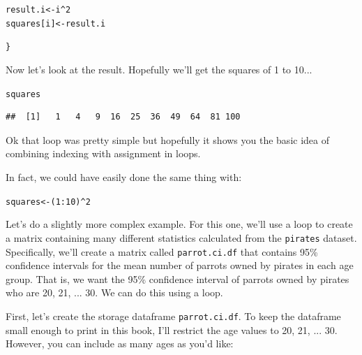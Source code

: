 \documentclass{tufte-book}\usepackage[]{graphicx}\usepackage[]{color}
\makeatletter
\newcommand{\hlnum}[1]{\textcolor[rgb]{0.686,0.059,0.569}{#1}}%
\newcommand{\hlopt}[1]{\textcolor[rgb]{0,0,0}{#1}}%
\newcommand{\hlstd}[1]{\textcolor[rgb]{0.345,0.345,0.345}{#1}}%
\newcommand{\hlkwb}[1]{\textcolor[rgb]{0.69,0.353,0.396}{#1}}%
\newenvironment{kframe}{%
 \def\at@end@of@kframe{}%
 \ifinner\ifhmode%
  \def\at@end@of@kframe{\end{minipage}}%
  \begin{minipage}{\columnwidth}%
 \fi\fi%
 \def\FrameCommand##1{\hskip\@totalleftmargin \hskip-\fboxsep
 \colorbox{shadecolor}{##1}\hskip-\fboxsep
     \hskip-\linewidth \hskip-\@totalleftmargin \hskip\columnwidth}%
 \MakeFramed {\advance\hsize-\width
   \@totalleftmargin\z@ \linewidth\hsize
   \@setminipage}}%
 {\par\unskip\endMakeFramed%
 \at@end@of@kframe}
\newenvironment{knitrout}{}{} %
\makeatother
\begin{document}
\begin{footnotesize}
\begin{knitrout}
\begin{kframe}
\begin{alltt}
  \hlstd{result.i} \hlkwb{<-} \hlstd{i} \hlopt{^} \hlnum{2}
  \hlstd{squares[i]} \hlkwb{<-} \hlstd{result.i}

\hlstd{\}}
\end{alltt}
\end{kframe}
\end{knitrout}

Now let's look at the result. Hopefully we'll get the squares of 1 to 10...

\begin{knitrout}
\color{fgcolor}\begin{kframe}
\begin{alltt}
\hlstd{squares}
\end{alltt}
\begin{verbatim}
##  [1]   1   4   9  16  25  36  49  64  81 100
\end{verbatim}
\end{kframe}
\end{knitrout}


Ok that loop was pretty simple but hopefully it shows you the basic idea of combining indexing with assignment in loops.

\begin{marginfigure} In fact, we could have easily done the same thing with:

\begin{knitrout}
\color{fgcolor}\begin{kframe}
\begin{alltt}
\hlstd{squares} \hlkwb{<-} \hlstd{(}\hlnum{1}\hlopt{:}\hlnum{10}\hlstd{)} \hlopt{^} \hlnum{2}
\end{alltt}
\end{kframe}
\end{knitrout}

\end{marginfigure}


Let's do a slightly more complex example. For this one, we'll use a loop to create a matrix containing many different statistics calculated from the \texttt{pirates} dataset. Specifically, we'll create a matrix called \texttt{parrot.ci.df} that contains  95\% confidence intervals for the mean number of parrots owned by pirates in each age group. That is, we want the 95\% confidence interval of parrots owned by pirates who are 20, 21, ... 30. We can do this using a loop. 


First, let's create the storage dataframe \texttt{parrot.ci.df}. To keep the dataframe small enough to print in this book, I'll restrict the age values to 20, 21, ... 30. However, you can include as many ages as you'd like:


\end{footnotesize}
\end{document}
